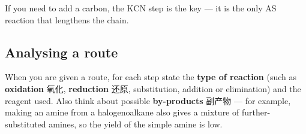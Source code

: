 \documentclass[11pt]{article}
\begin{document}
If you need to add a carbon, the $\text{KCN}$ step is the key — it is the only AS reaction that lengthens the chain.

\subsection*{Analysing a route}

When you are given a route, for each step state the \textbf{type of reaction} (such as \textbf{oxidation} 氧化, \textbf{reduction} 还原, substitution, addition or elimination) and the reagent used. Also think about possible \textbf{by-products} 副产物 — for example, making an amine from a halogenoalkane also gives a mixture of further-substituted amines, so the yield of the simple amine is low.
\end{document}
